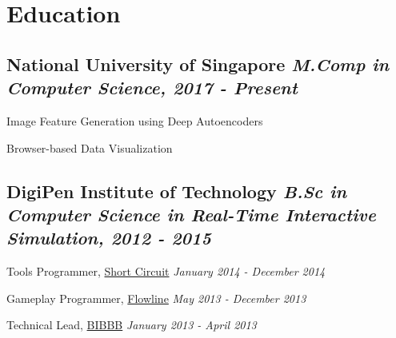 \documentclass[letterpaper,11pt]{article}
\newcommand{\cvitem}[1]{\hspace{10pt}\vspace{2.5pt} \small\scshape\raggedright \textcolor{item_color}{#1}\\}
\newcommand{\link}[2]{\textcolor{link_color}{\href{#1}{#2}}}
\newcommand{\qualifier}[1]{\hfill \textsl{\footnotesize #1}}
\begin{document}
\section{Education}

\subsection{National University of Singapore \qualifier{M.Comp in Computer Science, 2017 - Present}}

    \cvitem{Image Feature Generation using Deep Autoencoders}
    \cvitem{Browser-based Data Visualization}

\subsection{DigiPen Institute of Technology \qualifier{B.Sc in Computer Science in Real-Time Interactive Simulation, 2012 - 2015}}

    \cvitem{Tools Programmer, \link{http://games.digipen.edu/games/shortcircuit}{Short Circuit} \qualifier{January 2014 - December 2014}}
    \cvitem{Gameplay Programmer, \link{http://games.digipen.edu/games/flowline}{Flowline} \qualifier{May 2013 - December 2013}}
    \cvitem{Technical Lead, \link{http://games.digipen.edu/games/bibbb}{BIBBB} \qualifier{January 2013 - April 2013}}
\end{document}
